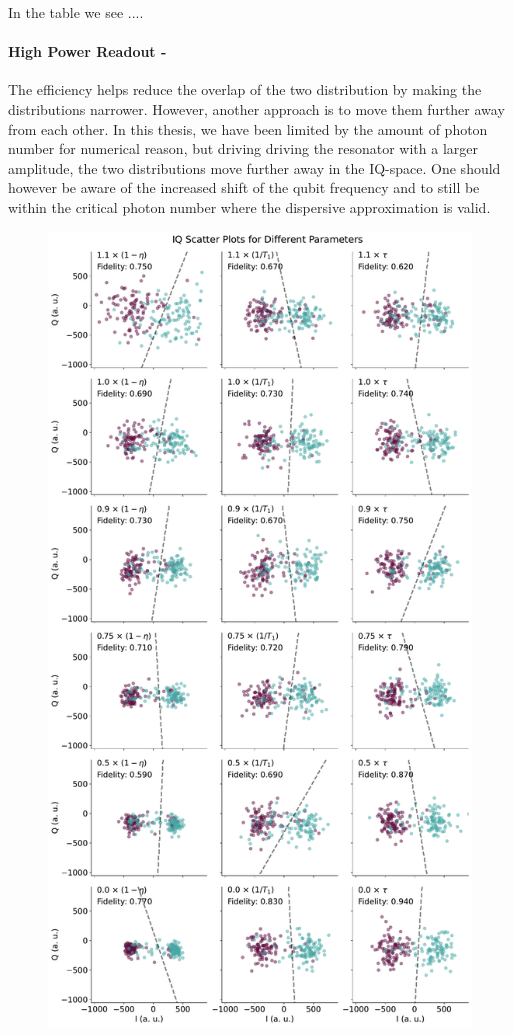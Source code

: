 In the table we see .... 

\paragraph{High Power Readout - } The efficiency helps reduce the overlap of the two distribution by making the distributions narrower. However, another approach is to move them further away from each other. In this thesis, we have been limited by the amount of photon number for numerical reason, but driving driving the resonator with a larger amplitude, the two distributions move further away in the IQ-space. One should however be aware of the increased shift of the qubit frequency and to still be within the critical photon number where the dispersive approximation is valid.

\begin{figure}
    \centering
    \includegraphics{Simulations/budgets/figures/iq_scatter_budgetting.pdf}

\end{figure}
